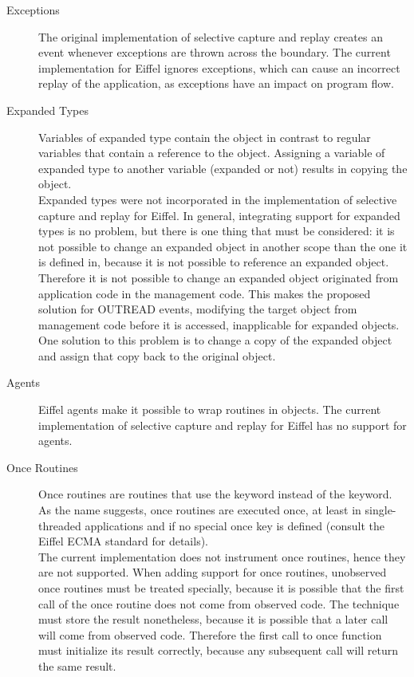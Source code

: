 \begin{description}
 \item [Exceptions] The original implementation of selective capture and replay creates an event whenever exceptions are thrown across the boundary. The current implementation for Eiffel ignores exceptions, which can cause an incorrect replay of the application, as exceptions have an impact on program flow. %

 \item [Expanded Types] Variables of expanded type contain the object in contrast to regular variables that contain a reference to the object. Assigning a variable of expanded type to another variable (expanded or not) results in copying the object.\\
Expanded types were not incorporated in the implementation of selective capture and replay for Eiffel. In general, integrating support for expanded types is no problem, but there is one thing that must be considered: it is not possible to change an expanded object in another scope than the one it is defined in, because it is not possible to reference an expanded object. Therefore it is not possible to change an expanded object originated from application code in the management code. This makes the proposed solution for OUTREAD events, modifying the target object from management code before it is accessed, inapplicable for expanded objects. One solution to this problem is to change a copy of the expanded object and assign that copy back to the original object.

 \item [Agents] Eiffel agents make it possible to wrap routines in objects. The current implementation of selective capture and replay for Eiffel has no support for agents.

 \item [Once Routines] Once routines are routines that use the  keyword instead of the  keyword. As the name suggests, once routines are executed once, at least in single-threaded applications and if no special once key is defined (consult the Eiffel ECMA standard \cite{Eiffel-ECMA} for details).\\
The current implementation does not instrument once routines, hence they are not supported. When adding support for once routines, unobserved once routines must be treated specially, because it is possible that the first call of the once routine does not come from observed code. The technique must store the result nonetheless, because it is possible that a later call will come from observed code. Therefore the first call to once function must initialize its result correctly, because any subsequent call will return the same result.
\end{description}

